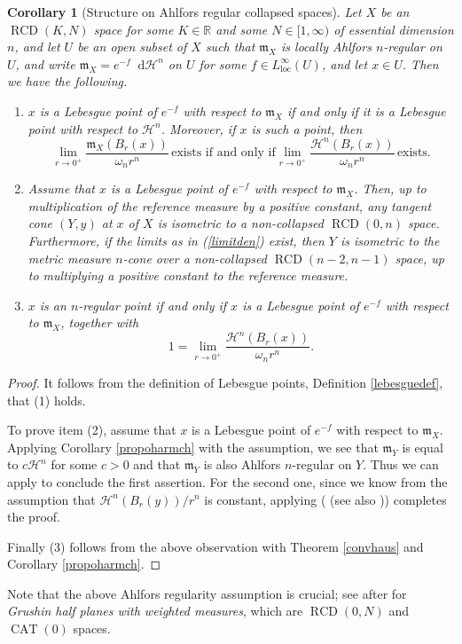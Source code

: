 \documentclass[11pt,reqno]{amsart}
\newtheorem{corollary}[theorem]{Corollary}
\theoremstyle{definition}
\numberwithin{equation}{section}
\newcommand{\di}{\mathop{}\!\mathrm{d}}
\newcommand{\meas}{\mathfrak{m}}
\DeclareMathOperator{\CAT}{CAT}
\DeclareMathOperator{\loc}{loc}
\DeclareMathOperator{\RCD}{RCD}
\newcommand{\haus}{\mathscr{H}}
\begin{document}
\begin{corollary}[Structure on Ahlfors regular collapsed spaces]\label{corconhaus}
    Let $X$ be an $\RCD(K, N)$ space for some $K \in \mathbb{R}$ and some $N \in [1, \infty)$ of essential dimension $n$, and let $U$ be an open subset of $X$  such that $\meas_X$ is locally Ahlfors $n$-regular on $U$, and write $\meas_X=e^{-f}\di \haus^n$ on $U$ for some $f \in L^{\infty}_{\loc}(U)$, and let $x \in U$. Then we have the following.
    \begin{enumerate}
        \item $x$ is a Lebesgue point of $e^{-f}$ with respect to $\meas_X$ if and only if it is a Lebesgue point with respect to $\haus^n$. Moreover, if $x$ is such a point, then 
        \begin{equation}\label{limitden}
    \lim_{r \to 0^+}\frac{\meas_X(B_r(x))}{\omega_nr^n}\, \text{exists if and only if}\lim_{r \to 0^+}\frac{\haus^n(B_r(x))}{\omega_nr^n}\,\text{exists.}
\end{equation}
        \item Assume that $x$ is a Lebesgue point of $e^{-f}$ with respect to $\meas_X$. Then, up to multiplication of the reference measure by a positive constant, any tangent cone $(Y, y)$ at $x$ of $X$ is isometric to a non-collapsed $\RCD(0, n)$ space. Furthermore, if the limits as in (\ref{limitden}) exist, then $Y$ is isometric to 
        the metric measure $n$-cone over a non-collapsed $\RCD(n-2, n-1)$ space, up to multiplying a positive constant to the reference measure.
        \item $x$ is an $n$-regular point if and only if $x$ is a Lebesgue point of $e^{-f}$ with respect to $\meas_X$, together with 
        \begin{equation}
            1=\lim_{r \to 0^+}\frac{\haus^n(B_r(x))}{\omega_nr^n}.
        \end{equation}
    \end{enumerate}
\end{corollary}
\begin{proof}
It follows from the definition of Lebesgue points, Definition \ref{lebesguedef}, that (1) holds.

To prove item (2), assume that $x$ is a Lebesgue point of $e^{-f}$ with respect to $\meas_X$. Applying Corollary \ref{propoharmch} with the assumption, we see that $\meas_Y$ is equal to $c\haus^n$ for some $c>0$ and that $\meas_Y$ is also Ahlfors $n$-regular on $Y$. Thus we can apply \cite[Theorem 2.20]{BGHZ} to conclude the first assertion. For the second one, since we know from the assumption that $\haus^n(B_r(y))/r^n$ is constant, applying (\cite[Theorem 1.1]{DG2} (see also \cite[Appendix A]{GV})) completes the proof.

Finally (3) follows from the above observation with Theorem \ref{convhaus} and Corollary \ref{propoharmch}.
\end{proof}
Note that the above Ahlfors regularity assumption is crucial; see \cite{DHPW} after \cite{PW} for \textit{Grushin half planes with weighted measures}, which are $\RCD(0, N)$ and $\CAT(0)$ spaces.
\end{document}
